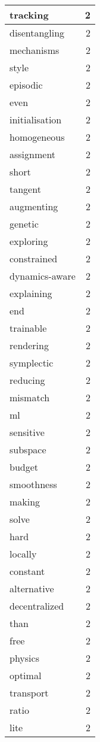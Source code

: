 \begin{table}[h]
\begin{tabular}{|l|r|}
tracking & 2 \\
\hline
disentangling & 2 \\
\hline
mechanisms & 2 \\
\hline
style & 2 \\
\hline
episodic & 2 \\
\hline
even & 2 \\
\hline
initialisation & 2 \\
\hline
homogeneous & 2 \\
\hline
assignment & 2 \\
\hline
short & 2 \\
\hline
tangent & 2 \\
\hline
augmenting & 2 \\
\hline
genetic & 2 \\
\hline
exploring & 2 \\
\hline
constrained & 2 \\
\hline
dynamics-aware & 2 \\
\hline
explaining & 2 \\
\hline
end & 2 \\
\hline
trainable & 2 \\
\hline
rendering & 2 \\
\hline
symplectic & 2 \\
\hline
reducing & 2 \\
\hline
mismatch & 2 \\
\hline
ml & 2 \\
\hline
sensitive & 2 \\
\hline
subspace & 2 \\
\hline
budget & 2 \\
\hline
smoothness & 2 \\
\hline
making & 2 \\
\hline
solve & 2 \\
\hline
hard & 2 \\
\hline
locally & 2 \\
\hline
constant & 2 \\
\hline
alternative & 2 \\
\hline
decentralized & 2 \\
\hline
than & 2 \\
\hline
free & 2 \\
\hline
physics & 2 \\
\hline
optimal & 2 \\
\hline
transport & 2 \\
\hline
ratio & 2 \\
\hline
lite & 2 \\

\end{tabular}
\end{table}
